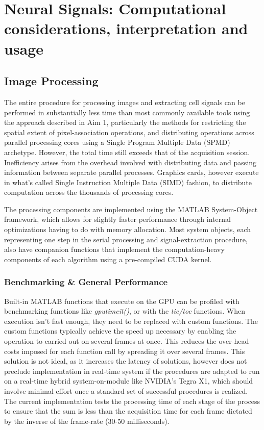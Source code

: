 % 

\thispagestyle{myheadings}

\chapter{Neural Signals: Computational considerations, interpretation and usage}
\label{sec:neural-signals}

\section{Image Processing}\label{sec:image-processing}

The entire procedure for processing images and extracting cell signals can be performed in substantially less time than most commonly available tools using the approach described in Aim 1, particularly the methods for restricting the spatial extent of pixel-association operations, and distributing operations across parallel processing cores using a Single Program Multiple Data (SPMD) archetype.
However, the total time still exceeds that of the acquisition session.
Inefficiency arises from the overhead involved with distributing data and passing information between separate parallel processes.
Graphics cards, however execute in what's called Single Instruction Multiple Data (SIMD) fashion, to distribute computation across the thousands of processing cores.

The processing components are implemented using the MATLAB System-Object framework, which allows for slightly faster performance through internal optimizations having to do with memory allocation.
Most system objects, each representing one step in the serial processing and signal-extraction procedure, also have companion functions that implement the computation-heavy components of each algorithm using a pre-compiled CUDA kernel.

\subsection{Benchmarking \& General Performance}\label{sec:benchmarking-general-performance}

Built-in MATLAB functions that execute on the GPU can be profiled with benchmarking functions like \emph{gputimeit()}, or with the \emph{tic/toc} functions.
When execution isn't fast enough, they need to be replaced with custom functions.
The custom functions typically achieve the speed up necessary by enabling the operation to carried out on several frames at once.
This reduces the over-head costs imposed for each function call by spreading it over several frames.
This solution is not ideal, as it increases the latency of solutions, however does not preclude implementation in real-time system if the procedures are adapted to run on a real-time hybrid system-on-module like NVIDIA's Tegra X1, which should involve minimal effort once a standard set of successful procedures is realized.
The current implementation tests the processing time of each stage of the process to ensure that the sum is less than the acquisition time for each frame dictated by the inverse of the frame-rate (30-50 milliseconds).

